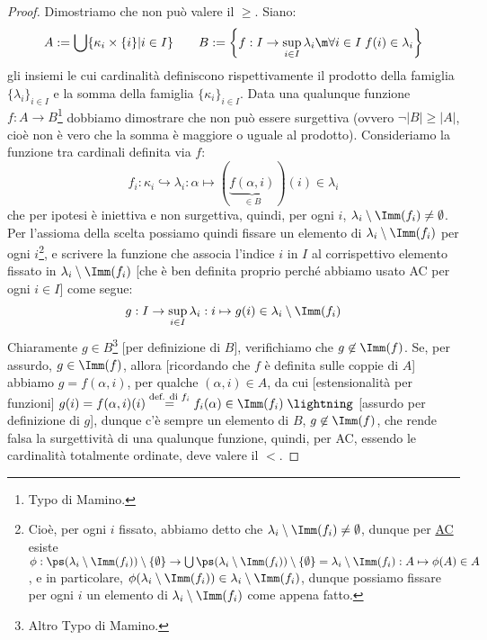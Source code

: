 \documentclass[11pt]{scrartcl}
\begin{document}
\begin{proof}
	Dimostriamo che non può valere il $\geq$. Siano:
	\[ A := \bigcup\{\kappa_i \times \{i\} | i \in I\} \qquad B := \left\{f : I \rightarrow \sup_{i \in I} \lambda_i \m \forall i \in I \; f(i) \in \lambda_i\right\} 
		\]
	gli insiemi le cui cardinalità definiscono rispettivamente il prodotto della famiglia $\{\lambda_i\}_{i \in I}$ e la somma della famiglia $\{\kappa_i\}_{i \in I}$.
	Data una qualunque funzione $f : A \rightarrow B$\footnote{Typo di Mamino.} dobbiamo dimostrare che non può essere surgettiva (ovvero $\neg |B| \geq |A|$, cioè non è vero che la somma è maggiore o uguale al prodotto).
	Consideriamo la funzione tra cardinali definita via $f$:
	\[ f_i : \kappa_i \hookrightarrow \lambda_i : \alpha \mapsto (\underbrace{f(\alpha,i)}_{\in B})(i) \in \lambda_i
		\]
	che per ipotesi è iniettiva e non surgettiva, quindi, per ogni $i$, $\lambda_i \setminus\Imm(f_i) \ne \emptyset$. Per l'assioma della scelta possiamo quindi fissare un elemento di $\lambda_i \setminus\Imm(f_i)$ per ogni $i$\footnote{Cioè, per ogni $i$ fissato, abbiamo detto che $\lambda_i\setminus\Imm(f_i) \ne \emptyset$, dunque per \hyperref[ax9]{AC} esiste $\phi : \ps(\lambda_i \setminus\Imm(f_i))\setminus\{\emptyset\} \rightarrow \bigcup \ps(\lambda_i \setminus\Imm(f_i))\setminus \{\emptyset\} = \lambda_i \setminus\Imm(f_i) : A \mapsto \phi(A) \in A$, 
	e in particolare, $\phi(\lambda_i \setminus\Imm(f_i)) \in \lambda_i \setminus\Imm(f_i)$, dunque possiamo fissare per ogni $i$ un elemento di $\lambda_i \setminus\Imm(f_i)$ come appena fatto.},
	e scrivere la funzione che associa l'indice $i$ in $I$ al corrispettivo elemento fissato in $\lambda_i \setminus \Imm(f_i)$ [che è ben definita proprio perché abbiamo usato AC per ogni $i \in I$] come segue:
	\[ g : I \rightarrow \sup_{i \in I} \lambda_i : i \mapsto g(i) \in \lambda_i \setminus \Imm(f_i)
		\]
	Chiaramente $g \in B$\footnote{Altro Typo di Mamino.} [per definizione di $B$], verifichiamo che $g \not \in \Imm(f)$. Se, per assurdo, $g \in \Imm(f)$, allora [ricordando che $f$ è definita sulle coppie di $A$]
	abbiamo $g = f(\alpha,i)$, per qualche $(\alpha, i) \in A$, da cui [estensionalità per funzioni] $g(i) = f(\alpha,i)(i) \overset{\text{def. di $f_i$}}{=} f_i(\alpha) \in \Imm(f_i) \; \lightning$ [assurdo per definizione di $g$], dunque c'è sempre un elemento di $B$, $g \not \in \Imm(f)$, che rende falsa la surgettività di una qualunque funzione, quindi, per AC, essendo le cardinalità totalmente ordinate, 
	deve valere il $<$.
\end{proof}
\end{document}
